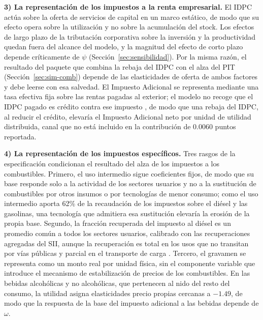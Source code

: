 \documentclass[11pt]{article}
\begin{document}
\textbf{3) La representación de los impuestos a la renta empresarial.} El IDPC actúa sobre la oferta de servicios de capital en un marco estático, de modo que su efecto opera sobre la utilización y no sobre la acumulación del stock. Los efectos de largo plazo de la tributación corporativa sobre la inversión y la productividad \cite{arnold_etal_2011} quedan fuera del alcance del modelo, y la magnitud del efecto de corto plazo depende críticamente de $\psi$ (Sección~\ref{sec:sensibilidad}). Por la misma razón, el resultado del paquete que combina la rebaja del IDPC con el alza del PIT (Sección~\ref{sec:sim-comb}) depende de las elasticidades de oferta de ambos factores y debe leerse con esa salvedad. El Impuesto Adicional se representa mediante una tasa efectiva fija sobre las rentas pagadas al exterior; el modelo no recoge que el IDPC pagado es crédito contra ese impuesto \cite{dl824}, de modo que una rebaja del IDPC, al reducir el crédito, elevaría el Impuesto Adicional neto por unidad de utilidad distribuida, canal que no está incluido en la contribución de 0.0060 puntos reportada.

\textbf{4) La representación de los impuestos específicos.} Tres rasgos de la especificación condicionan el resultado del alza de los impuestos a los combustibles. Primero, el uso intermedio sigue coeficientes fijos, de modo que su base responde solo a la actividad de los sectores usuarios y no a la sustitución de combustibles por otros insumos o por tecnologías de menor consumo; como el uso intermedio aporta 62\% de la recaudación de los impuestos sobre el diésel y las gasolinas, una tecnología que admitiera esa sustitución elevaría la erosión de la propia base. Segundo, la fracción recuperada del impuesto al diésel es un promedio común a todos los sectores usuarios, calibrado con las recuperaciones agregadas del SII, aunque la recuperación es total en los usos que no transitan por vías públicas \cite[art.~7]{ley18502} y parcial en el transporte de carga \cite{ley19764}. Tercero, el gravamen se representa como un monto real por unidad física, sin el componente variable que introduce el mecanismo de estabilización de precios de los combustibles. En las bebidas alcohólicas y no alcohólicas, que pertenecen al nido del resto del consumo, la utilidad asigna elasticidades precio propias cercanas a $-1.49$, de modo que la respuesta de la base del impuesto adicional a las bebidas depende de $\omega$.
\end{document}
